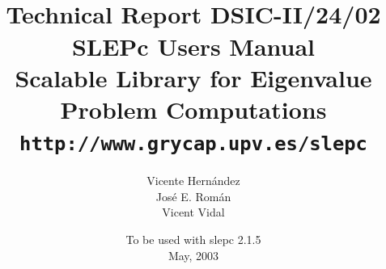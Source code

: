 \documentclass[titlepage,10pt,a4paper]{slepc}
\newcommand{\slepcversion}{2.1.5}
\newcommand{\packnoi}[1]{{\sc #1}\xspace}
\newcommand{\slepc}{\packnoi{slep\rm c}}
\newcommand{\slepchome}{http://www.grycap.upv.es/slepc}
\newcommand{\url}[1]{\texttt{#1}}
\begin{document}
\title{
 	\vspace*{-1cm}
	\\[2cm]
	\normalsize Technical Report DSIC-II/24/02
	\\[2cm]
	\vspace*{6mm}
	{\Large\bf\sffamily 
	SLEPc Users Manual\\[2mm]}
	{\large\bf\sffamily 
	Scalable Library for Eigenvalue Problem Computations}\\[2mm]
	\vspace*{6mm}
	\vspace*{6mm}
	\url{\slepchome}
	\\[6mm]
}

\author{
	Vicente Hern\'andez
	\\
	Jos\'e E. Rom\'an
	\\
	Vicent Vidal
	\\[2cm]
}

\date{
	To be used with \slepc \slepcversion\\
	May, 2003
}

{
\pagestyle{empty}
\maketitle
}

\setlength{\textheight}{14.99cm}
\setlength{\footskip}{2cm}
\setlength{\voffset}{2.3cm}

\pagestyle{empty}
\cleardoublepage
\end{document}

